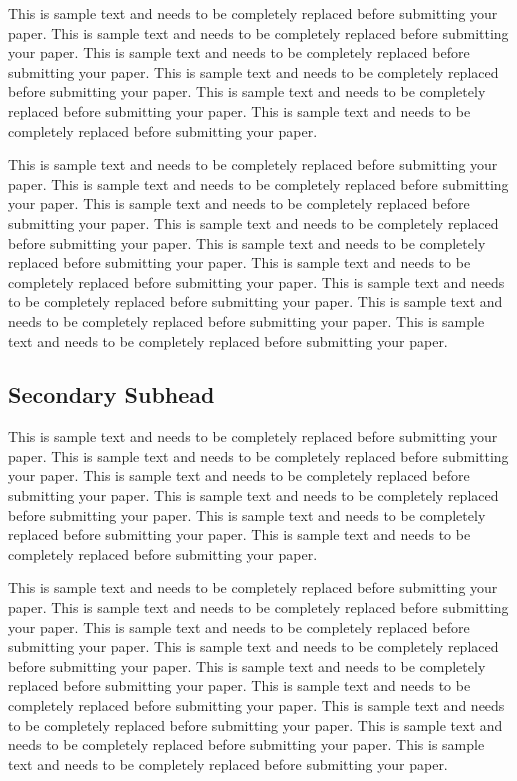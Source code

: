 \documentclass[11pt]{asaproc}
\begin{document}
This is sample text and needs to be completely replaced before submitting your paper. This is sample text and needs to be completely replaced before submitting your paper. This is sample text and needs to be completely replaced before submitting your paper. This is sample text and needs to be completely replaced before submitting your paper. This is sample text and needs to be completely replaced before submitting your paper. This is sample text and needs to be completely replaced before submitting your paper.

This is sample text and needs to be completely replaced before submitting your paper. This is sample text and needs to be completely replaced before submitting your paper. This is sample text and needs to be completely replaced before submitting your paper. This is sample text and needs to be completely replaced before submitting your paper. This is sample text and needs to be completely replaced before submitting your paper. This is sample text and needs to be completely replaced before submitting your paper. This is sample text and needs to be completely replaced before submitting your paper. This is sample text and needs to be completely replaced before submitting your paper. This is sample text and needs to be completely replaced before submitting your paper. 

\subsection{Secondary Subhead}


This is sample text and needs to be completely replaced before submitting your paper. This is sample text and needs to be completely replaced before submitting your paper. This is sample text and needs to be completely replaced before submitting your paper. This is sample text and needs to be completely replaced before submitting your paper. This is sample text and needs to be completely replaced before submitting your paper. This is sample text and needs to be completely replaced before submitting your paper.

This is sample text and needs to be completely replaced before submitting your paper. This is sample text and needs to be completely replaced before submitting your paper. This is sample text and needs to be completely replaced before submitting your paper. This is sample text and needs to be completely replaced before submitting your paper. This is sample text and needs to be completely replaced before submitting your paper. This is sample text and needs to be completely replaced before submitting your paper. This is sample text and needs to be completely replaced before submitting your paper. This is sample text and needs to be completely replaced before submitting your paper. This is sample text and needs to be completely replaced before submitting your paper. 
\end{document}
